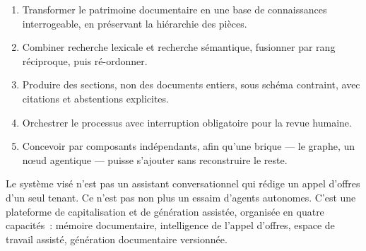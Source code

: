 \begin{enumerate}
  \item {} Transformer le patrimoine
        documentaire en une base de connaissances interrogeable, en
        préservant la hiérarchie des pièces.
  \item {} Combiner recherche lexicale et
        recherche sémantique, fusionner par rang réciproque, puis
        ré-ordonner.
  \item {} Produire des sections, non des
        documents entiers, sous schéma contraint, avec citations et
        abstentions explicites.
  \item {} Orchestrer le processus avec
        interruption obligatoire pour la revue humaine.
  \item {} Concevoir par composants
        indépendants, afin qu'une brique --- le graphe, un n\oe ud
        agentique --- puisse s'ajouter sans reconstruire le reste.
\end{enumerate}

\begin{btpnote}
Le système visé n'est pas un assistant conversationnel qui rédige un appel
d'offres d'un seul tenant. Ce n'est pas non plus un essaim d'agents
autonomes. C'est une plateforme de capitalisation et de génération
assistée, organisée en quatre capacités~: mémoire documentaire, intelligence
de l'appel d'offres, espace de travail assisté, génération documentaire
versionnée.
\end{btpnote}
